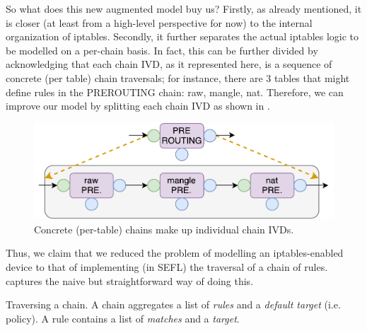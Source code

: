 So what does this new augmented model buy us?  Firstly, as already mentioned,
it is closer (at least from a high-level perspective for now) to the internal
organization of iptables.  Secondly, it further separates the actual iptables
logic to be modelled on a per-chain basis.  In fact, this can be further
divided by acknowledging that each chain IVD, as it represented here, is a
sequence of concrete (per table) chain traversals; for instance, there are 3
tables that might define rules in the PREROUTING chain: raw, mangle, nat.
Therefore, we can improve our model by splitting each chain IVD as shown in
.

\begin{figure}[h]
  \centering
  \captionsetup{justification=centering}
  \includegraphics[scale=0.5]{src/img/iptables-2-composition}
  \caption[Concrete (per-table) chains make up individual chain IVDs.]{Concrete
  (per-table) chains make up individual chain IVDs.}
  \label{fig:iptables-2-composition}
\end{figure}

Thus, we claim that we reduced the problem of modelling an iptables-enabled
device to that of implementing (in SEFL) the traversal of a chain of rules.
 captures the naive but
straightforward way of doing this.

\begin{algorithm}[H]

  \caption[Traversing a chain.]{Traversing a chain. A chain aggregates a list
  of \emph{rules} and a \emph{default target} (i.e. policy). A rule contains a
  list of \emph{matches} and a \emph{target}.}
  \label{algo:chain-traversal}
\end{algorithm}

